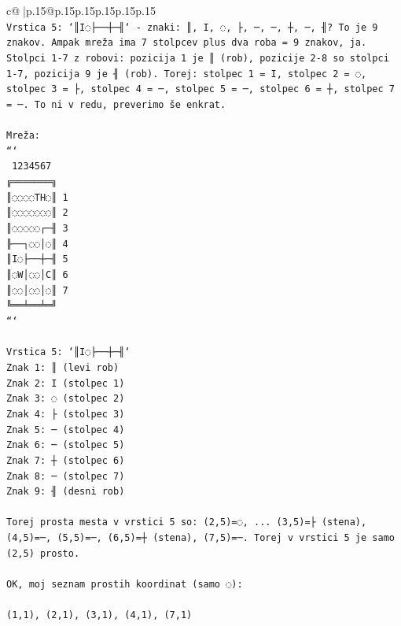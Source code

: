 \documentclass{article}
\begin{document}
{\begin{supertabular}{c@{$\;$}|p{.15\linewidth}@{}p{.15\linewidth}p{.15\linewidth}p{.15\linewidth}p{.15\linewidth}p{.15\linewidth}}
{{{\\ 
\texttt{Vrstica 5: `║I◌├──┼─╢` {-} znaki: ║, I, ◌, ├, ─, ─, ┼, ─, ╢? To je 9 znakov. Ampak mreža ima 7 stolpcev plus dva roba = 9 znakov, ja. Stolpci 1{-}7 z robovi: pozicija 1 je ║ (rob), pozicije 2{-}8 so stolpci 1{-}7, pozicija 9 je ╢ (rob). Torej: stolpec 1 = I, stolpec 2 = ◌, stolpec 3 = ├, stolpec 4 = ─, stolpec 5 = ─, stolpec 6 = ┼, stolpec 7 = ─. To ni v redu, preverimo še enkrat.} \\
\\ 
\texttt{Mreža:} \\
\texttt{```} \\
\texttt{ 1234567} \\
\texttt{╔═══════╗} \\
\texttt{║◌◌◌◌TH◌║ 1} \\
\texttt{║◌◌◌◌◌◌◌║ 2} \\
\texttt{║◌◌◌◌◌┌─╢ 3} \\
\texttt{╟──┐◌◌│◌║ 4} \\
\texttt{║I◌├──┼─╢ 5} \\
\texttt{║◌W│◌◌│C║ 6} \\
\texttt{║◌◌│◌◌│◌║ 7} \\
\texttt{╚══╧══╧═╝} \\
\texttt{```} \\
\\ 
\texttt{Vrstica 5: `║I◌├──┼─╢`} \\
\texttt{Znak 1: ║ (levi rob)} \\
\texttt{Znak 2: I (stolpec 1)} \\
\texttt{Znak 3: ◌ (stolpec 2)} \\
\texttt{Znak 4: ├ (stolpec 3)} \\
\texttt{Znak 5: ─ (stolpec 4)} \\
\texttt{Znak 6: ─ (stolpec 5)} \\
\texttt{Znak 7: ┼ (stolpec 6)} \\
\texttt{Znak 8: ─ (stolpec 7)} \\
\texttt{Znak 9: ╢ (desni rob)} \\
\\ 
\texttt{Torej prosta mesta v vrstici 5 so: (2,5)=◌, ... (3,5)=├ (stena), (4,5)=─, (5,5)=─, (6,5)=┼ (stena), (7,5)=─. Torej v vrstici 5 je samo (2,5) prosto.} \\
\\ 
\texttt{OK, moj seznam prostih koordinat (samo ◌):} \\
\\ 
\texttt{(1,1), (2,1), (3,1), (4,1), (7,1)} \\
}}}
\end{supertabular}}
\end{document}
